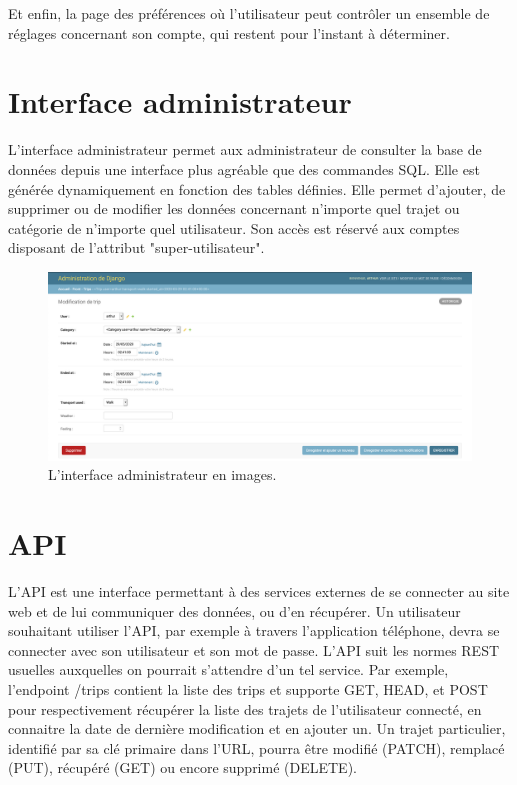 Et enfin, la page des préférences où l'utilisateur peut contrôler un ensemble de réglages concernant son compte, qui restent pour l'instant à déterminer. 

\section{Interface administrateur}

L'interface administrateur permet aux administrateur de consulter la base de données depuis une interface plus agréable que des commandes SQL. Elle est générée dynamiquement en fonction des tables définies. Elle permet d'ajouter, de supprimer ou de modifier les données concernant n'importe quel trajet ou catégorie de n'importe quel utilisateur. Son accès est réservé aux comptes disposant de l'attribut "super-utilisateur".

\begin{figure}[h]
    \centering
    \includegraphics[keepaspectratio, width=2\textwidth/2, height=2\textheight/5]{ima/interface-admin}
    \caption{L'interface administrateur en images.}
    \label{fig:80-interface-administrateur}
\end{figure}


\section{API}

L'API est une interface permettant à des services externes de se connecter au site web et de lui communiquer des données, ou d'en récupérer. Un utilisateur souhaitant utiliser l'API, par exemple à travers l'application téléphone, devra se connecter avec son utilisateur et son mot de passe.
L'API suit les normes REST usuelles auxquelles on pourrait s'attendre d'un tel service. Par exemple, l'endpoint /trips contient la liste des trips et supporte GET, HEAD, et POST pour respectivement récupérer la liste des trajets de l'utilisateur connecté, en connaitre la date de dernière modification et en ajouter un.
Un trajet particulier, identifié par sa clé primaire dans l'URL, pourra être modifié (PATCH), remplacé (PUT), récupéré (GET) ou encore supprimé (DELETE).

